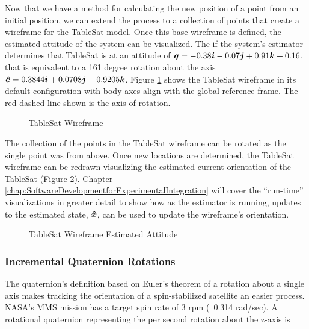 Now that we have a method for calculating the new position of a point from an initial position, we can extend the process to a collection of points that create a wireframe for the TableSat model.  Once this base wireframe is defined, the estimated attitude of the system can be visualized.  The if the system's estimator determines that TableSat is at an attitude of $\boldsymbol{q} = -0.38\boldsymbol{i}-0.07\boldsymbol{j}+0.91\boldsymbol{k}+0.16$, that is equivalent to a 161 degree rotation about the axis $\boldsymbol{\hat{e}} = 0.3844\boldsymbol{i}+0.0708\boldsymbol{j}-0.9205\boldsymbol{k}$.  Figure \ref{fig:TSatWireframe} shows the TableSat wireframe in its default configuration with body axes align with the global reference frame.  The red dashed line shown is the axis of rotation.


\begin{figure}[H]
  \centerline{}
  \caption{TableSat Wireframe}
  \label{fig:TSatWireframe}
\end{figure}

The collection of the points in the TableSat wireframe can be rotated as the single point was from above.  Once new locations are determined, the TableSat wireframe can be redrawn visualizing the estimated current orientation of the TableSat (Figure \ref{fig:TSatWireframeEstimatedAttitude}).  Chapter \ref{chap:SoftwareDevelopmentforExperimentalIntegration} will cover the ``run-time'' visualizations in greater detail to show how as the estimator is running, updates to the estimated state, $\boldsymbol{\hat{x}}$, can be used to update the wireframe's orientation.

\begin{figure}[H]
  \centerline{}
  \caption{TableSat Wireframe Estimated Attitude}
  \label{fig:TSatWireframeEstimatedAttitude}
\end{figure}


\subsubsection{Incremental Quaternion Rotations}
\label{subsubsec:IncrementalQuaternionRotations}

The quaternion's definition based on Euler's theorem of a rotation about a single axis makes tracking the orientation of a spin-stabilized satellite an easier process.  NASA's MMS mission has a target spin rate of 3 rpm (~0.314 rad/sec).  A rotational quaternion representing the per second rotation about the z-axis is

